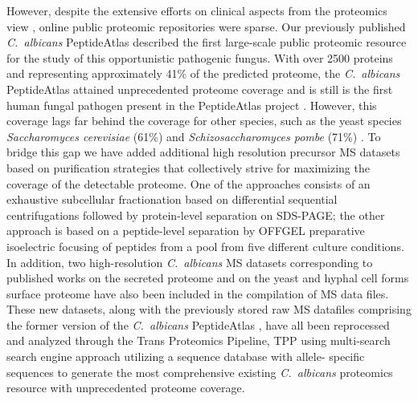 However, despite the extensive efforts on clinical
aspects from the proteomics view \citep{Pitarch2006,Cabezon2009,Pitarch2009,Rupp2004},
online public proteomic repositories were sparse.
Our previously published \textit{\mbox{C. albicans}} PeptideAtlas \citep{Vialas2013} described the first large-scale public
proteomic resource for the study of this opportunistic pathogenic fungus. With over 2500
proteins and representing approximately 41\% of the predicted proteome, the \textit{\mbox{C. albicans}}
PeptideAtlas attained unprecedented proteome coverage and is still is the first human fungal
pathogen present in the PeptideAtlas project \citep{Desiere2006,Deutsch2015}. 
However, this coverage lags far behind
the coverage for other species, such as the yeast species \textit{Saccharomyces cerevisiae} (61\%)
\citep{King2006} and \textit{Schizosaccharomyces pombe} (71\%) \citep{Gunaratne2013b}. 
To bridge this gap we have added
additional high resolution precursor MS datasets based on purification strategies that
collectively strive for maximizing the coverage of the detectable proteome. One of the
approaches consists of an exhaustive subcellular fractionation based on differential
sequential centrifugations followed by protein-level separation on SDS-PAGE; the other
approach is based on a peptide-level separation by OFFGEL preparative isoelectric focusing
of peptides \citep{Ros2002,Horth2006} from a pool from five different culture conditions. 
In addition, two high-resolution \textit{\mbox{C. albicans}} MS datasets corresponding to published works on the secreted
proteome \citep{Gil-Bona2015a} and on the yeast and hyphal cell forms surface proteome \citep{Gil-Bona2015} have also been
included in the compilation of MS data files. These new datasets, along with the previously
stored raw MS datafiles comprising the former version of the \textit{\mbox{C. albicans}} PeptideAtlas \citep{Vialas2013},
have all been reprocessed and analyzed through the Trans Proteomics Pipeline, TPP \citep{Keller2005, Deutsch2015}
 using multi-search search engine approach utilizing a sequence database with allele-
specific sequences to generate the most comprehensive existing \textit{\mbox{C. albicans}} proteomics
resource with unprecedented proteome coverage.


